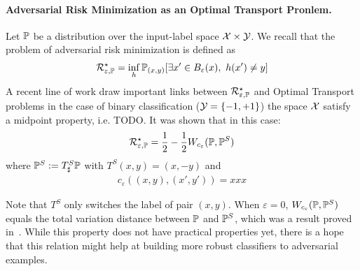 
\paragraph{Adversarial Risk Minimization as an Optimal Transport Pronlem.} Let $\mathbb{P}$ be a distribution over the input-label space $\mathcal{X}\times\mathcal{Y}$. We recall that the problem of adversarial risk minimization is defined as
\begin{align*}
    \risk_{\varepsilon,\PP}^\star = \inf_{h} \PP_{(x,y)}\left[\exists x'\in B_\varepsilon(x),~h(x')\neq y\right]
\end{align*}
A recent line of work draw important links between   $\mathcal{R}_{\varepsilon,\mathbb{P}}^\star$ and Optimal Transport problems in the case of binary classification ($\mathcal{Y}=\{-1,+1\}$) the space $\mathcal{X}$ satisfy a midpoint property, i.e. TODO. It was shown that in this case:
\begin{align*}
\mathcal{R}_{\varepsilon,\mathbb{P}}^\star = \frac12-\frac12 W_{c_\varepsilon}(\mathbb{P},\mathbb{P}^S)
\end{align*}
where $\mathbb{P}^S := T^S_\sharp \mathbb{P}$ with $T^S(x,y) = (x,-y)$ and
\begin{align*}
    c_\varepsilon\left((x,y),(x',y')\right) = xxx
\end{align*}

Note that $T^S$ only switches the label of pair $(x,y)$. When $\varepsilon=0$, $W_{c_\varepsilon}(\mathbb{P},\mathbb{P}^S)$ equals the total variation distance between $\mathbb{P}$ and $\mathbb{P}^S$, which was a result proved in~\citep{xxx}.
While this property does not have practical properties yet, there is a hope that this relation might help at building more robust classifiers to adversarial examples. 


